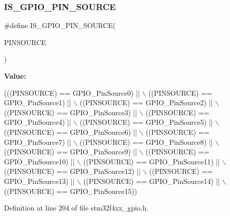 \subsubsection{\texorpdfstring{I\+S\+\_\+\+G\+P\+I\+O\+\_\+\+P\+I\+N\+\_\+\+S\+O\+U\+R\+CE}{IS\_GPIO\_PIN\_SOURCE}}
{\footnotesize\ttfamily \#define I\+S\+\_\+\+G\+P\+I\+O\+\_\+\+P\+I\+N\+\_\+\+S\+O\+U\+R\+CE(\begin{DoxyParamCaption}\item[{}]{P\+I\+N\+S\+O\+U\+R\+CE }\end{DoxyParamCaption})}

{\bfseries Value\+:}
\begin{DoxyCode}
(((PINSOURCE) == GPIO\_PinSource0) || \(\backslash\)
                                       ((PINSOURCE) == GPIO\_PinSource1) || \(\backslash\)
                                       ((PINSOURCE) == GPIO\_PinSource2) || \(\backslash\)
                                       ((PINSOURCE) == GPIO\_PinSource3) || \(\backslash\)
                                       ((PINSOURCE) == GPIO\_PinSource4) || \(\backslash\)
                                       ((PINSOURCE) == GPIO\_PinSource5) || \(\backslash\)
                                       ((PINSOURCE) == GPIO\_PinSource6) || \(\backslash\)
                                       ((PINSOURCE) == GPIO\_PinSource7) || \(\backslash\)
                                       ((PINSOURCE) == GPIO\_PinSource8) || \(\backslash\)
                                       ((PINSOURCE) == GPIO\_PinSource9) || \(\backslash\)
                                       ((PINSOURCE) == GPIO\_PinSource10) || \(\backslash\)
                                       ((PINSOURCE) == GPIO\_PinSource11) || \(\backslash\)
                                       ((PINSOURCE) == GPIO\_PinSource12) || \(\backslash\)
                                       ((PINSOURCE) == GPIO\_PinSource13) || \(\backslash\)
                                       ((PINSOURCE) == GPIO\_PinSource14) || \(\backslash\)
                                       ((PINSOURCE) == GPIO\_PinSource15))
\end{DoxyCode}


Definition at line 204 of file stm32f4xx\+\_\+gpio.\+h.

